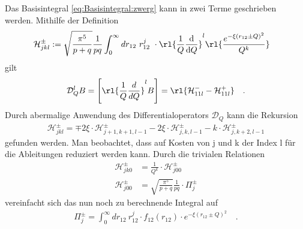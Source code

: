 Das Basisintegral \ref{eq:Basisintegral:zwerg} kann in zwei Terme 
geschrieben werden. Mithilfe der Definition 
%
\begin{align}
\mathcal{H}^\pm_{jkl}&:=\sqrt{\frac{\pi^5}{p+q}}\frac{1}{pq} \int_{0}^{\infty} 
dr_{12}\ r_{12}^j\ \cdot 
\rl{\frac{1}{Q}\frac{\text{d}}{\text{d}Q}}^l\rl{\frac{e^{-\xi(r_{12}\pm 
			Q)^2}}{Q^k}}
\end{align}
%
gilt
%
\begin{align}\label{eq:diff_op}
\mathcal{D}_Q^lB=\left[\rl{\frac{1}{Q}\frac{d}{dQ}}^lB\right] 
=\rl{\mathcal{H}^-_{11l}-\mathcal{H}^+_{11l}} \quad .
\end{align}
%
Durch abermalige Anwendung des Differentialoperators $\mathcal{D}_Q$ kann die 
Rekursion
%
\begin{align}\label{eq:rek:H}
\mathcal{H}_{jkl}^{\pm} = \mp 2\xi\cdot \mathcal{H}_{j+1,k+1,l-1}^\pm-2\xi\cdot 
\mathcal{H}_{j,k,l-1}^\pm-k\cdot\mathcal{H}_{j,k+2,l-1}^\pm
\end{align}
%
gefunden werden. Man beobachtet, dass auf Kosten von j und k der Index l für 
die Ableitungen reduziert werden kann. Durch die trivialen Relationen
\begin{align} \label{eq:prop:H}
\mathcal{H}_{jk0}^{\pm} &= \frac{1}{Q^k} \cdot \mathcal{H}_{j00}^\pm\\ 
\mathcal{H}_{j00}^{\pm} &=\sqrt{\frac{\pi^5}{p+q}}\frac{1}{pq} \cdot \Pi_j^\pm
\end{align}
vereinfacht sich das nun noch zu berechnende Integral auf
\begin{align}\label{eq:PI-Integrale}
\Pi_j^\pm= \int_{0}^{\infty}dr_{12}\ r_{12}^j \cdot f_{12}(r_{12}) \cdot 
e^{-\xi (r_{12} \pm Q)^2}\quad .
\end{align}
%
%
%
